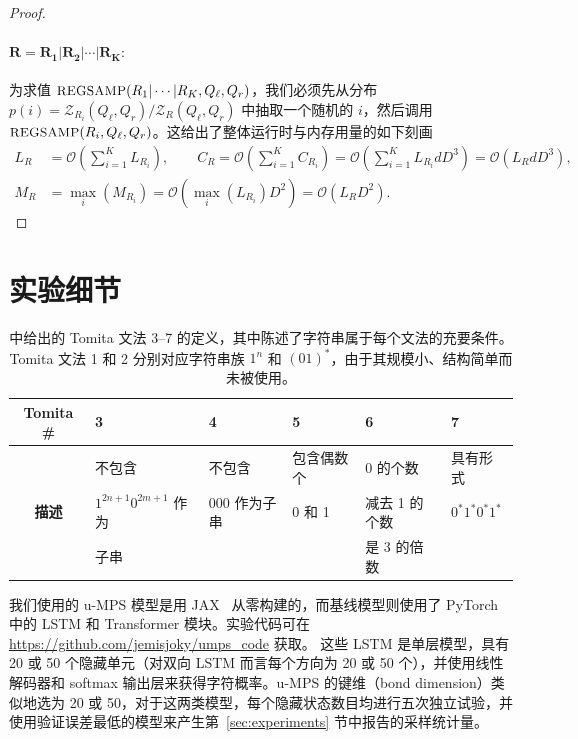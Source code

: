 \documentclass[twoside]{article}
\newcommand{\Sample}{\textsc{\small REGSAMP}}
\newcommand{\bigO}{\mc{O}}
\newcommand{\QL}{Q_{\ell}}
\newcommand{\QR}{Q_{r}}
\newcommand{\mc}[1]{\mathcal{#1}}
\begin{document}
\begin{proof}
\paragraph{$\mathbf{R = R_1 | R_2 | \cdots | R_K:}$} 为求值 $\Sample(R_1 | \cdots | R_K, \QL, \QR)$，我们必须先从分布 $p(i) = \mc{Z}_{R_i}(\QL, \QR) / \mc{Z}_R(\QL, \QR)$ 中抽取一个随机的 $i$，然后调用 $\Sample(R_i, \QL, \QR)$。这给出了整体运行时与内存用量的如下刻画
%
\begin{align*}
    L_R &= \bigO\left(\sum_{i=1}^K L_{R_i}\right), \qquad C_R = \bigO\!\left(\sum_{i=1}^K C_{R_i}\right) = \bigO\!\left(\sum_{i=1}^K L_{R_i} d D^3\right) = \bigO(L_R d D^3), \\
    M_R &= \max_i(M_{R_i}) = \bigO(\max_i(L_{R_i}) D^2) = \bigO(L_R D^2).
\end{align*}

\end{proof}

\section{实验细节}
\label{sec:appendix_d}

\begin{table}[h]
\caption{\citep{bengio1994} 中给出的 Tomita 文法 3--7 的定义，其中陈述了字符串属于每个文法的充要条件。Tomita 文法 1 和 2 分别对应字符串族 $1^n$ 和 $(01)^*$，由于其规模小、结构简单而未被使用。}
\label{tab:tomita_def}
\begin{center}
\begin{small}
\begin{tabular}{c|lllll}
    \textbf{Tomita \#} & 3 & 4 & 5 & 6 & 7 \\
    \midrule
    \multirow{3}{*}{\textbf{描述}} & 不包含                 & 不包含               & 包含偶数个      & 0 的个数           & 具有形式 \\
                                  & $1^{2n+1}0^{2m+1}$ 作为 & $000$ 作为子串       & 0 和 1        & 减去 1 的个数        & $0^*1^*0^*1^*$ \\
                                  & 子串                   &                      &               & 是 3 的倍数          &
\end{tabular}
\end{small}
\end{center}
\end{table}

我们使用的 u-MPS 模型是用 JAX~\citep{jax2018} 从零构建的，而基线模型则使用了 PyTorch~\citep{paszke2017} 中的 LSTM 和 Transformer 模块。实验代码可在 \url{https://github.com/jemisjoky/umps_code} 获取。
这些 LSTM 是单层模型，具有 20 或 50 个隐藏单元（对双向 LSTM 而言每个方向为 20 或 50 个），并使用线性解码器和 softmax 输出层来获得字符概率。u-MPS 的键维（bond dimension）类似地选为 20 或 50，对于这两类模型，每个隐藏状态数目均进行五次独立试验，并使用验证误差最低的模型来产生第~\ref{sec:experiments} 节中报告的采样统计量。
\end{document}
